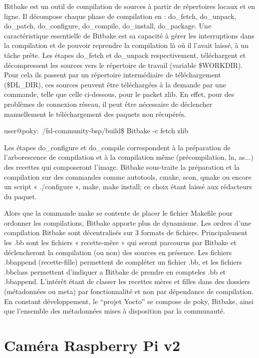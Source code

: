 Bitbake est un outil de compilation de sources à partir de répertoires locaux et en ligne. Il
décompose chaque phase de compilation en : do\_fetch, do\_unpack, do\_patch,
do\_configure, do\_compile, do\_install, do\_package. Une caractéristique essentielle de
Bitbake est sa capacité à gérer les interruptions dans la compilation et de pouvoir
reprendre la compilation là où il l'avait laissé, à un tâche prête.
Les étapes do\_fetch et do\_unpack respectivement, téléchargent et décompressent les
sources vers le répertoire de travail (variable \$WORKDIR). Pour cela ils passent par un
répertoire intermédiaire de téléchargement (\$DL\_DIR), ces sources peuvent être
téléchargées à la demande par une commande, telle que celle ci-dessous, pour le packet
zlib. En effet, pour des problèmes de connexion réseau, il peut être nécessaire de
déclencher manuellement le téléchargement des paquets non récupérés.

\begin{tcolorbox}
    user@poky:~/fsl-community-bsp/build\$ Bitbake -c fetch zlib
\end{tcolorbox}

Les étapes do\_configure et do\_compile correspondent à la préparation de l'arborescence
de compilation et à la compilation même (précompilation, ln, as...)
des recettes qui composeront l’image. Bitbake sous-traite la préparation et la
compilation sur des commandes comme autotools, cmake, scon, qmake ou encore un
script « ./configure », make, make install; ce choix étant laissé aux rédacteurs du paquet.

Alors que la commande make se contente de placer le fichier Makefile pour ordonner les
compilations, Bitbake apporte plus de dynamisme. Les ordres d’une compilation Bitbake
sont décentralisés sur 3 formats de fichiers. Principalement les .bb sont les fichiers «
recette-mère » qui seront parcourus par Bitbake et déclencheront la compilation (ou non)
des sources en présence. Les fichiers .bbappend (recette-fille) permettent de compléter un
fichier .bb, et les fichiers .bbclass permettent d’indiquer a Bitbake de prendre en compteles
.bb et .bbappend. L'intérêt étant de classer les recettes mères et filles dans des
dossiers (métadonnées ou meta) par fonctionnalité et non par dépendance de compilation.
En constant développement, le “projet Yocto” se compose de poky, Bitbake, ainsi que
l’ensemble des métadonnées mises à disposition par la communauté.

\section{Caméra Raspberry Pi v2}

